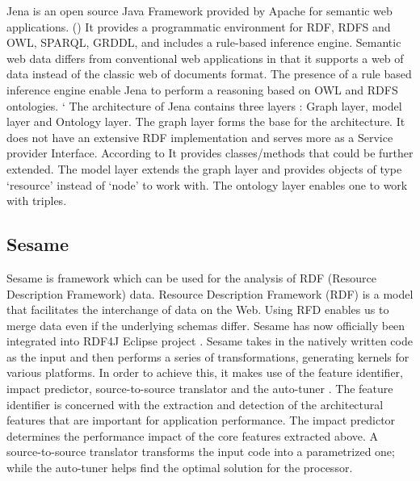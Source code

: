      Jena is an open source Java Framework provided by Apache for
     semantic web applications. (\cite{www-w3-jena}) It provides a
     programmatic environment for RDF, RDFS and OWL, SPARQL, GRDDL,
     and includes a rule-based inference engine. Semantic web data
     differs from conventional web applications in that it supports a
     web of data instead of the classic web of documents format. The
     presence of a rule based inference engine enable Jena to perform
     a reasoning based on OWL and RDFS ontologies.
     \cite{www-trimc-nlp-blogspot} ` The architecture of Jena
     contains three layers : Graph layer, model layer and Ontology
     layer. The graph layer forms the base for the architecture. It
     does not have an extensive RDF implementation and serves more as
     a Service provider Interface. According to
     \cite{www-trimc-nlp-blogspot} It provides classes/methods that
     could be further extended. The model layer extends the graph
     layer and provides objects of type ‘resource’ instead of ‘node’
     to work with.  The ontology layer enables one to work with
     triples.

\subsection{Sesame}

     Sesame is framework which can be used for the analysis of RDF
     (Resource Description Framework) data.  Resource Description
     Framework (RDF) \cite{www-RDF} is a model that facilitates the
     interchange of data on the Web.  Using RFD enables us to merge
     data even if the underlying schemas differ.  Sesame has now 
     officially been integrated into RDF4J Eclipse project \cite{www-sesame}.  
     Sesame takes in the natively written code as the input and then 
     performs a series of transformations, generating kernels for
     various platforms.  In order to achieve this, it makes use of the
     feature identifier, impact predictor, source-to-source translator 
     and the auto-tuner \cite{sesame-paper-2013}.  The
     feature identifier is concerned with the extraction and detection
     of the architectural features that are important for application
     performance.  The impact predictor determines the performance
     impact of the core features extracted above.  A source-to-source
     translator transforms the input code into a parametrized one;
     while the auto-tuner helps find the optimal solution for the
     processor.
     
